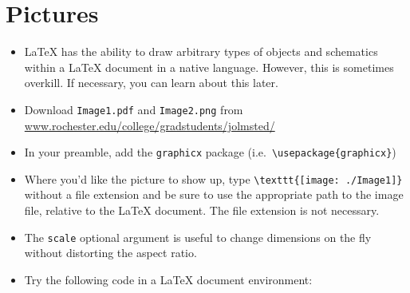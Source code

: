 \section{Pictures}

\begin{itemize}

\item \LaTeX{} has the ability to draw arbitrary types of objects and schematics
  within a \LaTeX{} document in a native language. However, this is sometimes
  overkill. If necessary, you can learn about this later.

\item Download \texttt{Image1.pdf} and \texttt{Image2.png} from
  \url{www.rochester.edu/college/gradstudents/jolmsted/}

\item In your preamble, add the \texttt{graphicx} package (i.e.\
  \verb!\usepackage{graphicx}!)

\item Where you'd like the picture to show up, type
  \verb!\texttt{[image: ./Image1]}! without a file extension and be
  sure to use the appropriate path to the image file, relative to the
  \LaTeX{} document. The file extension is not necessary.
\item The \verb!scale! optional argument is useful to change
  dimensions on the fly without distorting the aspect ratio.
\item Try the following code in a \LaTeX{} document environment:

  \ovalbox{
    \begin{minipage}{\linewidth}
\begin{verbatim}


\end{verbatim}
\end{minipage}}
\end{itemize}
